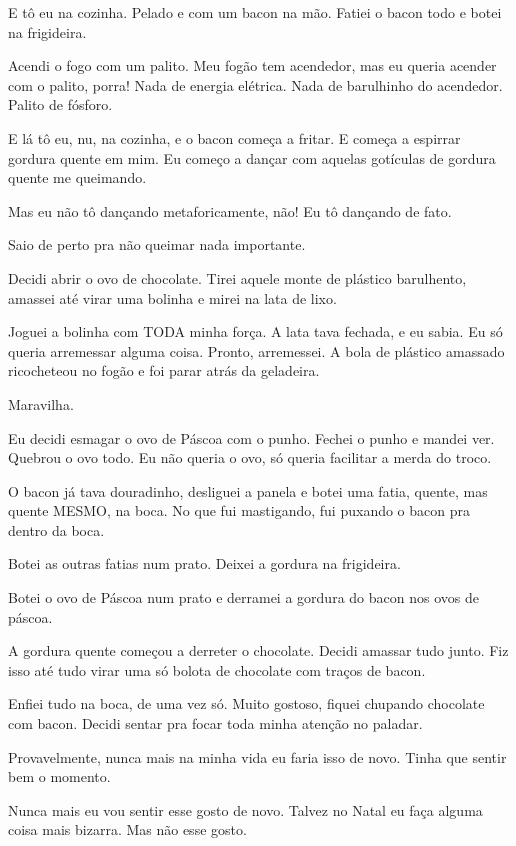 E tô eu na cozinha. Pelado e com um bacon na mão. Fatiei o bacon todo e botei na frigideira.

Acendi o fogo com um palito. Meu fogão tem acendedor, mas eu queria acender com o palito, porra! Nada de energia elétrica. Nada de barulhinho do acendedor. Palito de fósforo.

E lá tô eu, nu, na cozinha, e o bacon começa a fritar. E começa a espirrar gordura quente em mim. Eu começo a dançar com aquelas gotículas de gordura quente me queimando.

Mas eu não tô dançando metaforicamente, não! Eu tô dançando de fato.

Saio de perto pra não queimar nada importante.

Decidi abrir o ovo de chocolate. Tirei aquele monte de plástico barulhento, amassei até virar uma bolinha e mirei na lata de lixo.

\begin{sloppypar}
Joguei a bolinha com TODA minha força. A lata tava fechada, e eu sabia. Eu só queria arremessar alguma coisa. Pronto, arremessei. A bola de plástico amassado ricocheteou no fogão e foi parar atrás da geladeira.
\end{sloppypar}

Maravilha.

Eu decidi esmagar o ovo de Páscoa com o punho. Fechei o punho e mandei ver. Quebrou o ovo todo. Eu não queria o ovo, só queria facilitar a merda do troco.

O bacon já tava douradinho, desliguei a panela e botei uma fatia, quente, mas quente MESMO, na boca. No que fui mastigando, fui puxando o bacon pra dentro da boca.

Botei as outras fatias num prato. Deixei a gordura na frigideira.

Botei o ovo de Páscoa num prato e derramei a gordura do bacon nos ovos de páscoa.

A gordura quente começou a derreter o chocolate. Decidi amassar tudo junto. Fiz isso até tudo virar uma só bolota de chocolate com traços de bacon.

Enfiei tudo na boca, de uma vez só. Muito gostoso, fiquei chupando chocolate com bacon. Decidi sentar pra focar toda minha atenção no paladar.

Provavelmente, nunca mais na minha vida eu faria isso de novo. Tinha que sentir bem o momento.

Nunca mais eu vou sentir esse gosto de novo. Talvez no Natal eu faça alguma coisa mais bizarra. Mas não esse gosto.

